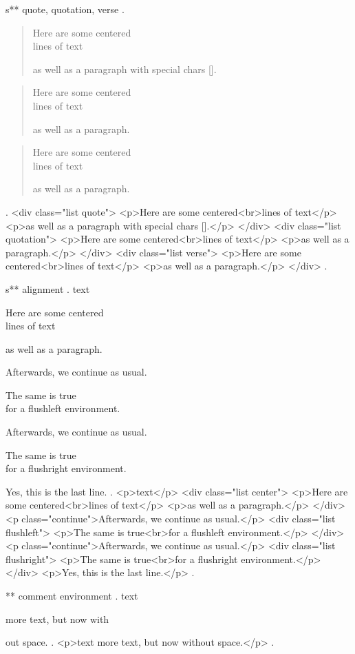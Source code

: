 s** quote, quotation, verse
.
\begin{quote}
    Here are some centered\\
    lines of text

    as well as a paragraph with special chars [].
\end{quote}

\begin{quotation}
    Here are some centered\\
    lines of text

    as well as a paragraph.
\end{quotation}

\begin{verse}
    Here are some centered\\
    lines of text

    as well as a paragraph.
\end{verse}
.
<div class="list quote">
<p>Here are some centered<br>lines of text</p>
<p>as well as a paragraph with special chars [].</p>
</div>
<div class="list quotation">
<p>Here are some centered<br>lines of text</p>
<p>as well as a paragraph.</p>
</div>
<div class="list verse">
<p>Here are some centered<br>lines of text</p>
<p>as well as a paragraph.</p>
</div>
.


s** alignment
.
text
\begin{center}
    Here are some centered\\
    lines of text

    as well as a paragraph.
\end{center}
Afterwards, we continue as usual.
\begin{flushleft}
    The same is true\\
    for a flushleft environment.
\end{flushleft}
Afterwards, we continue as usual.
\begin{flushright}
    The same is true\\
    for a flushright environment.
\end{flushright}

Yes, this is the last line.
.
<p>text</p>
<div class="list center">
<p>Here are some centered<br>lines of text</p>
<p>as well as a paragraph.</p>
</div>
<p class="continue">Afterwards, we continue as usual.</p>
<div class="list flushleft">
<p>The same is true<br>for a ﬂushleft environment.</p>
</div>
<p class="continue">Afterwards, we continue as usual.</p>
<div class="list flushright">
<p>The same is true<br>for a ﬂushright environment.</p>
</div>
<p>Yes, this is the last line.</p>
.



** comment environment
.
text
\begin{comment}
    This is a comment.
    \end{comment
    still more comment.
\end{comment}
more text, but now with%
\begin{comment}
    This is a comment.
\end{comment}
out space.
.
<p>text more text, but now without space.</p>
.